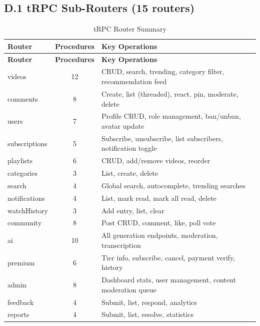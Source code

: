 \subsection*{D.1 tRPC Sub-Routers (15 routers)}
{\small
\begin{longtable}{|J{3.2cm}|c|J{7.5cm}|}
\caption{tRPC Router Summary} \label{tab:trpc-routers} \\
\hline
\textbf{Router} & \textbf{Procedures} & \textbf{Key Operations} \\
\hline
\endfirsthead
\hline
\textbf{Router} & \textbf{Procedures} & \textbf{Key Operations} \\
\hline
\endhead
videos & 12 & CRUD, search, trending, category filter, recommendation feed \\
\hline
comments & 8 & Create, list (threaded), react, pin, moderate, delete \\
\hline
users & 7 & Profile CRUD, role management, ban/unban, avatar update \\
\hline
subscriptions & 5 & Subscribe, unsubscribe, list subscribers, notification toggle \\
\hline
playlists & 6 & CRUD, add/remove videos, reorder \\
\hline
categories & 3 & List, create, delete \\
\hline
search & 4 & Global search, autocomplete, trending searches \\
\hline
notifications & 4 & List, mark read, mark all read, delete \\
\hline
watchHistory & 3 & Add entry, list, clear \\
\hline
community & 8 & Post CRUD, comment, like, poll vote \\
\hline
ai & 10 & All generation endpoints, moderation, transcription \\
\hline
premium & 6 & Tier info, subscribe, cancel, payment verify, history \\
\hline
admin & 8 & Dashboard stats, user management, content moderation queue \\
\hline
feedback & 4 & Submit, list, respond, analytics \\
\hline
reports & 4 & Submit, list, resolve, statistics \\
\hline
\end{longtable}
}

